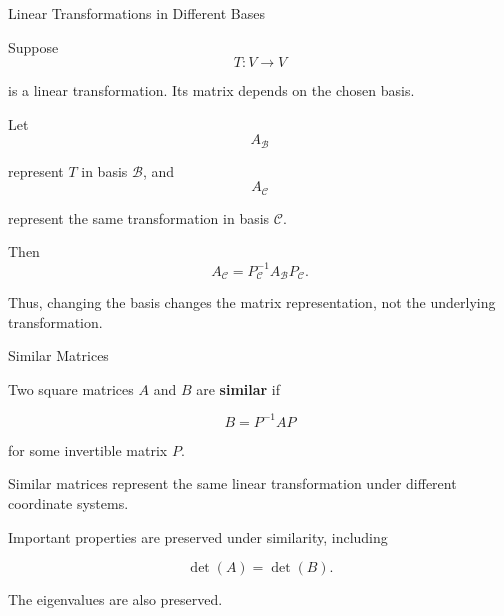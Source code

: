 \begin{frame}{Linear Transformations in Different Bases}

Suppose
\vspace{-0.1cm}
\[
T:V\rightarrow V
\]

is a linear transformation. Its matrix depends on the chosen basis.

Let
\vspace{-0.1cm}
\[
A_{\mathcal{B}}
\]

represent $T$ in basis $\mathcal{B}$, and
\vspace{-0.1cm}
\[
A_{\mathcal{C}}
\]

represent the same transformation in basis $\mathcal{C}$.

Then
\vspace{-0.1cm}
\[
\boxed{
A_{\mathcal{C}}
=
P_{\mathcal{C}}^{-1}
A_{\mathcal{B}}
P_{\mathcal{C}}.
}
\]

Thus, changing the basis changes the matrix representation,
not the underlying transformation.

\end{frame}



\begin{frame}{Similar Matrices}

Two square matrices $A$ and $B$ are \textbf{similar} if

\[
\boxed{
B=P^{-1}AP
}
\]

for some invertible matrix $P$.

\vspace{0.4cm}

Similar matrices represent the same linear transformation
under different coordinate systems.

\vspace{0.4cm}

Important properties are preserved under similarity,
including

\[
\boxed{
\det(A)=\det(B).
}
\]

The eigenvalues are also preserved.

\end{frame}



